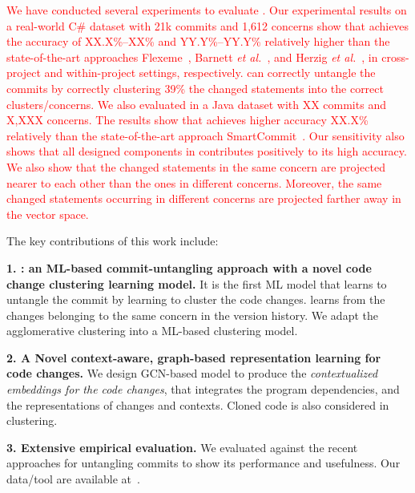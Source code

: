   \textcolor{red}{We have conducted several experiments to evaluate
    {\tool}. Our experimental results on a real-world C\# dataset with
    21k commits and 1,612 concerns show that {\tool} achieves the
    accuracy of XX.X\%--XX\% and YY.Y\%--YY.Y\% relatively higher than
    the state-of-the-art approaches Flexeme~\cite{flexeme-fse20},
    Barnett {\em et al.}~\cite{barnett-icse15}, and Herzig {\em et
      al.}~\cite{kim-emse16}, in cross-project and within-project
    settings, respectively. {\tool} can correctly untangle the commits
    by correctly clustering 39\% the changed statements into the
    correct clusters/concerns.
%
  We also evaluated {\tool} in a Java dataset with XX commits and
  X,XXX concerns. The results show that {\tool} achieves higher
  accuracy XX.X\% relatively than the state-of-the-art approach
  SmartCommit~\cite{smartcommit-fse21}. Our sensitivity also shows
  that all designed components in {\tool} contributes positively to
  its high accuracy. We also show that the changed statements in the
  same concern are projected nearer to each other than the ones in
  different concerns. Moreover, the same changed statements occurring
  in different concerns are projected farther away in the vector
  space.}

The key contributions of this work include:

{\bf 1. {\tool}: an ML-based commit-untangling approach with a novel
  code change clustering learning model.} It is the first ML model
that learns to untangle the commit by learning to cluster the code
changes.  {\tool} learns from the changes belonging to the same
concern in the version history. We adapt the agglomerative clustering
into a ML-based clustering model.

{\bf 2. A Novel context-aware, graph-based representation learning for
  code changes.} We design GCN-based model to produce the {\em
  contextualized embeddings for the code changes}, that
integrates the program dependencies, and the representations of changes
and contexts. Cloned code is also considered in clustering.

{\bf 3. Extensive empirical evaluation.} We evaluated {\tool} against
the recent approaches for untangling commits to show its performance
and usefulness. Our data/tool are available at~\cite{utango-website}.
